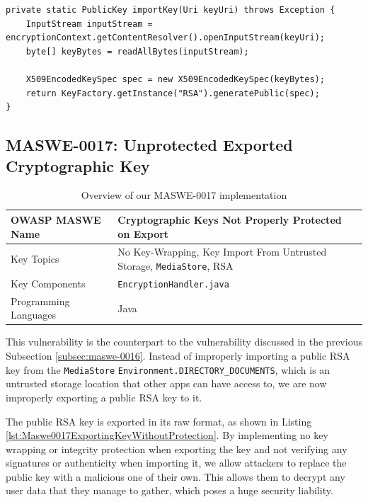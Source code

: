 \begin{lstlisting}[style=JavaStyle, float=tbh, captionpos=b, caption={Importing a public RSA key from untrusted storage without sanitization}, label={lst:Maswe0016ImportingKey}]
private static PublicKey importKey(Uri keyUri) throws Exception {
    InputStream inputStream = encryptionContext.getContentResolver().openInputStream(keyUri);
    byte[] keyBytes = readAllBytes(inputStream);

    X509EncodedKeySpec spec = new X509EncodedKeySpec(keyBytes);
    return KeyFactory.getInstance("RSA").generatePublic(spec);
}
\end{lstlisting}

\subsection{MASWE-0017: Unprotected Exported Cryptographic Key}
\label{subsec:maswe-0017}

\begin{table}[H]
    \centering
    \renewcommand{\arraystretch}{1.3}
        \begin{tabular}{p{5cm} p{8cm}} 
        \toprule
        OWASP MASWE Name & Cryptographic Keys Not Properly Protected on Export \\ 
        \midrule
        Key Topics & No Key-Wrapping, Key Import From Untrusted Storage, \texttt{MediaStore}, RSA \\
        Key Components & \texttt{EncryptionHandler.java} \\
        Programming Languages & Java \\ 
        \bottomrule
        \end{tabular}
    \caption{Overview of our MASWE-0017 implementation}
    \label{tab:maswe-0017}
\end{table}
This vulnerability is the counterpart to the vulnerability discussed in the previous Subsection \ref{subsec:maswe-0016}. Instead of improperly importing a public RSA key from the \texttt{MediaStore} \texttt{Environment.DIRECTORY\_DOCUMENTS}, which is an untrusted storage location that other apps can have access to, we are now improperly exporting a public RSA key to it.

The public RSA key is exported in its raw format, as shown in Listing \ref{lst:Maswe0017ExportingKeyWithoutProtection}. By implementing no key wrapping or integrity protection when exporting the key and not verifying any signatures or authenticity when importing it, we allow attackers to replace the public key with a malicious one of their own. This allows them to decrypt any user data that they manage to gather, which poses a huge security liability.

